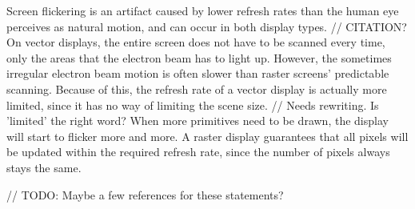 Screen flickering is an artifact caused by lower refresh rates than the human eye perceives as natural motion, and can occur in both display types. // CITATION?
On vector displays, the entire screen does not have to be scanned every time, only the areas that the electron beam has to light up.
However, the sometimes irregular electron beam motion is often slower than raster screens' predictable scanning.
Because of this, the refresh rate of a vector display is actually more limited, since it has no way of limiting the scene size. // Needs rewriting. Is 'limited' the right word?
When more primitives need to be drawn, the display will start to flicker more and more.
A raster display guarantees that all pixels will be updated within the required refresh rate, since the number of pixels always stays the same.

// TODO: Maybe a few references for these statements?